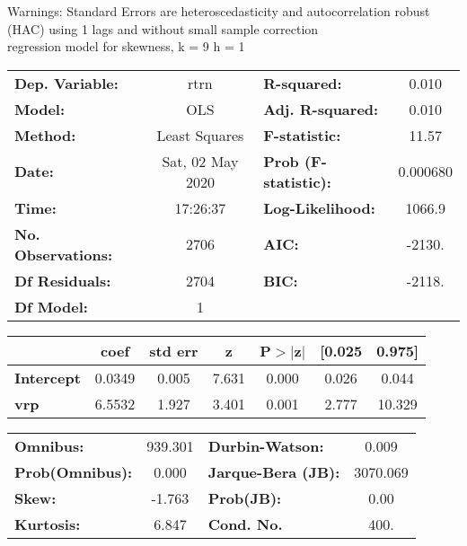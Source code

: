 Warnings: \newline
 [1] Standard Errors are heteroscedasticity and autocorrelation robust (HAC) using 1 lags and without small sample correction\\ 

regression model for skewness, k = 9 h = 1\begin{center}
\begin{tabular}{lclc}
\toprule
\textbf{Dep. Variable:}    &       rtrn       & \textbf{  R-squared:         } &     0.010   \\
\textbf{Model:}            &       OLS        & \textbf{  Adj. R-squared:    } &     0.010   \\
\textbf{Method:}           &  Least Squares   & \textbf{  F-statistic:       } &     11.57   \\
\textbf{Date:}             & Sat, 02 May 2020 & \textbf{  Prob (F-statistic):} &  0.000680   \\
\textbf{Time:}             &     17:26:37     & \textbf{  Log-Likelihood:    } &    1066.9   \\
\textbf{No. Observations:} &        2706      & \textbf{  AIC:               } &    -2130.   \\
\textbf{Df Residuals:}     &        2704      & \textbf{  BIC:               } &    -2118.   \\
\textbf{Df Model:}         &           1      & \textbf{                     } &             \\
\bottomrule
\end{tabular}
\begin{tabular}{lcccccc}
                   & \textbf{coef} & \textbf{std err} & \textbf{z} & \textbf{P$> |$z$|$} & \textbf{[0.025} & \textbf{0.975]}  \\
\midrule
\textbf{Intercept} &       0.0349  &        0.005     &     7.631  &         0.000        &        0.026    &        0.044     \\
\textbf{vrp}       &       6.5532  &        1.927     &     3.401  &         0.001        &        2.777    &       10.329     \\
\bottomrule
\end{tabular}
\begin{tabular}{lclc}
\textbf{Omnibus:}       & 939.301 & \textbf{  Durbin-Watson:     } &    0.009  \\
\textbf{Prob(Omnibus):} &   0.000 & \textbf{  Jarque-Bera (JB):  } & 3070.069  \\
\textbf{Skew:}          &  -1.763 & \textbf{  Prob(JB):          } &     0.00  \\
\textbf{Kurtosis:}      &   6.847 & \textbf{  Cond. No.          } &     400.  \\
\bottomrule
\end{tabular}
\end{center}

